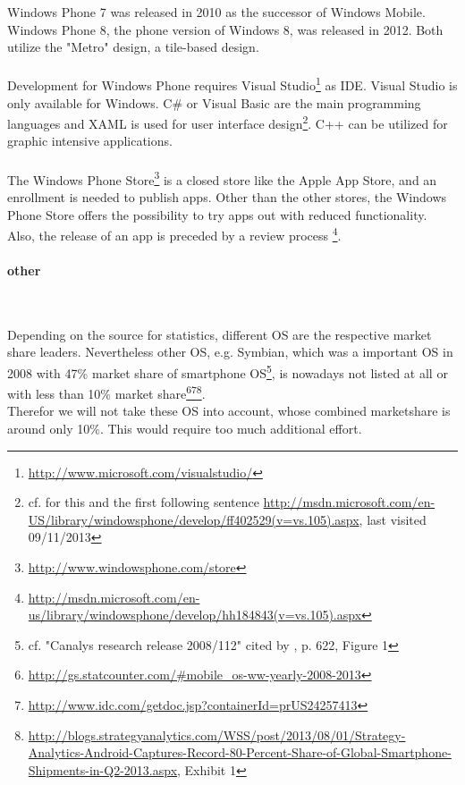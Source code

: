 \vspace{0.75em}
Windows Phone 7 was released in 2010 as the successor of Windows Mobile. Windows Phone 8, the phone version of Windows 8, was released in 2012. Both utilize the "Metro" design, a tile-based design.
\\
\\
Development for Windows Phone requires Visual Studio\footnote{\url{http://www.microsoft.com/visualstudio/}} as IDE. Visual Studio is only available for Windows. C\# or Visual Basic are the main programming languages and XAML is used for user interface design\footnote{cf. for this and the first following sentence \url{http://msdn.microsoft.com/en-US/library/windowsphone/develop/ff402529(v=vs.105).aspx}, last visited 09/11/2013}. C++ can be utilized for graphic intensive applications.
\\
\\
The Windows Phone Store\footnote{\url{http://www.windowsphone.com/store}} is a closed store like the Apple App Store, and an enrollment is needed to publish apps. Other than the other stores, the Windows Phone Store offers the possibility to try apps out with reduced functionality. Also, the release of an app is preceded by a review process \footnote{\url{http://msdn.microsoft.com/en-us/library/windowsphone/develop/hh184843(v=vs.105).aspx}}.

\paragraph{other}$\;$

\vspace{0.75em}
Depending on the source for statistics, different OS are the respective market share leaders. Nevertheless other OS, e.g. Symbian, which was a important OS in 2008 with 47\% market share of smartphone OS\footnote{cf. "Canalys research release 2008/112" cited by \cite{Lin.2009}, p. 622, Figure 1}, is nowadays not listed at all or with less than 10\% market share\footnote{\url{http://gs.statcounter.com/\#mobile_os-ww-yearly-2008-2013}}\footnote{\url{http://www.idc.com/getdoc.jsp?containerId=prUS24257413}}\footnote{\url{http://blogs.strategyanalytics.com/WSS/post/2013/08/01/Strategy-Analytics-Android-Captures-Record-80-Percent-Share-of-Global-Smartphone-Shipments-in-Q2-2013.aspx}, Exhibit 1}.
\\
Therefor we will not take these OS into account, whose combined marketshare is around only 10\%. This would require too much additional effort.

